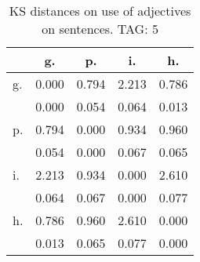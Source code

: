 \begin{table}[h!]
\begin{center}
\begin{tabular}{| l | c | c | c | c |}\hline
 & g. & p. & i. & h. \\\hline
g. & 0.000  & 0.794  & 2.213  & 0.786 \\\hline
 & 0.000  & 0.054  & 0.064  & 0.013 \\\hline
p. & 0.794  & 0.000  & 0.934  & 0.960 \\\hline
 & 0.054  & 0.000  & 0.067  & 0.065 \\\hline
i. & 2.213  & 0.934  & 0.000  & 2.610 \\\hline
 & 0.064  & 0.067  & 0.000  & 0.077 \\\hline
h. & 0.786  & 0.960  & 2.610  & 0.000 \\\hline
 & 0.013  & 0.065  & 0.077  & 0.000 \\\hline
\end{tabular}
\caption{KS distances on use of adjectives on sentences. TAG: 5}
\end{center}
\end{table}